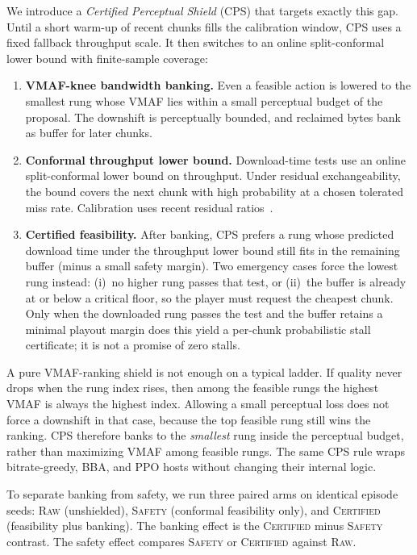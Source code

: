 We introduce a \emph{Certified Perceptual Shield} (CPS) that targets exactly this gap.
Until a short warm-up of recent chunks fills the calibration window, CPS uses a fixed fallback throughput scale.
It then switches to an online split-conformal lower bound with finite-sample coverage:
\begin{enumerate}
  \item \textbf{VMAF-knee bandwidth banking.} Even a feasible action is lowered to the smallest rung whose VMAF lies within a small perceptual budget of the proposal. The downshift is perceptually bounded, and reclaimed bytes bank as buffer for later chunks.
  \item \textbf{Conformal throughput lower bound.} Download-time tests use an online split-conformal lower bound on throughput. Under residual exchangeability, the bound covers the next chunk with high probability at a chosen tolerated miss rate. Calibration uses recent residual ratios~\cite{vovk2005algorithmic,angelopoulos2023gentle}.
  \item \textbf{Certified feasibility.} After banking, CPS prefers a rung whose predicted download time under the throughput lower bound still fits in the remaining buffer (minus a small safety margin). Two emergency cases force the lowest rung instead: (i)~no higher rung passes that test, or (ii)~the buffer is already at or below a critical floor, so the player must request the cheapest chunk. Only when the downloaded rung passes the test and the buffer retains a minimal playout margin does this yield a per-chunk probabilistic stall certificate; it is not a promise of zero stalls.
\end{enumerate}
A pure VMAF-ranking shield is not enough on a typical ladder.
If quality never drops when the rung index rises, then among the feasible rungs the highest VMAF is always the highest index.
Allowing a small perceptual loss does not force a downshift in that case, because the top feasible rung still wins the ranking.
CPS therefore banks to the \emph{smallest} rung inside the perceptual budget, rather than maximizing VMAF among feasible rungs.
The same CPS rule wraps bitrate-greedy, BBA, and PPO hosts without changing their internal logic.

To separate banking from safety, we run three paired arms on identical episode seeds: \textsc{Raw} (unshielded), \textsc{Safety} (conformal feasibility only), and \textsc{Certified} (feasibility plus banking).
The banking effect is the \textsc{Certified} minus \textsc{Safety} contrast. The safety effect compares \textsc{Safety} or \textsc{Certified} against \textsc{Raw}.

